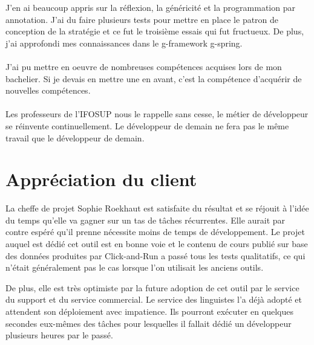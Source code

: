 J'en ai beaucoup appris sur la réflexion, la généricité et la programmation par annotation.
J'ai du faire plusieurs tests pour mettre en place le patron de conception de la stratégie et ce fut le troisième essais qui fut fructueux.
De plus, j'ai approfondi mes connaissances dans le \gls{g-framework} \Gls{g-spring}.

\paragraph{}
J'ai pu mettre en oeuvre de nombreuses compétences acquises lors de mon bachelier.
Si je devais en mettre une en avant, c'est la compétence d'acquérir de nouvelles compétences.

\paragraph{}
Les professeurs de l'IFOSUP nous le rappelle sans cesse, le métier de développeur se réinvente continuellement.
Le développeur de demain ne fera pas le même travail que le développeur de demain.

\section{Appréciation du client}
\label{sec:client-loves-me}

La cheffe de projet Sophie Roekhaut est satisfaite du résultat et se réjouit à l'idée du temps qu'elle va gagner sur un tas de tâches récurrentes.
Elle aurait par contre espéré qu'il prenne nécessite moins de temps de développement.
Le projet auquel est dédié cet outil est en bonne voie et le contenu de cours publié sur base des données produites par Click-and-Run a passé tous les tests qualitatifs, ce qui n'était généralement pas le cas lorsque l'on utilisait les anciens outils.

De plus, elle est très optimiste par la future adoption de cet outil par le service du support et du service commercial.
Le service des linguistes l'a déjà adopté et attendent son déploiement avec impatience.
Ils pourront exécuter en quelques secondes eux-mêmes des tâches pour lesquelles il fallait dédié un développeur plusieurs heures par le passé.
